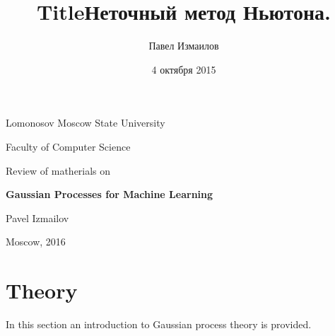 \documentclass[12pt]{article}
\title{Title}
\title{Неточный метод Ньютона.}
\date{4 октября 2015}
\author{Павел Измаилов}
\begin{document}
\renewcommand{\contentsname}{\centerline{\bf Contents}}
\renewcommand{\refname}{\centerline{\bf Literature}}

\newcommand{\GP}{\mathcal{GP}}
\newcommand{\E}{\mathbb{E}}
\newcommand{\R}{\mathbb{R}}
\newcommand{\N}{\mathcal{N}}
\newcommand{\cov}{\mbox{cov}}
\newcommand{\Nystrom}{Nystr\"{o}m }
\newcommand{\KL}[2]{\mbox{KL}\left(#1\mbox{ || }#2\right)}
\newcommand{\tr}{\mbox{tr}}
\newcommand{\derivative}[2]{\frac{\partial #1}{\partial #2}}

\newlength{\arrayrulewidthOriginal}
\newcommand{\Cline}[2]{%
  \noalign{\global\setlength{\arrayrulewidthOriginal}{\arrayrulewidth}}%
  \noalign{\global\setlength{\arrayrulewidth}{#1}}\cline{#2}%
  \noalign{\global\setlength{\arrayrulewidth}{\arrayrulewidthOriginal}}}

\newtheorem{definition}{Definition}
\newtheorem{theorem}{Theorem}


\def\vec#1{\mathchoice{\mbox{\boldmath$\displaystyle#1$}}
{\mbox{\boldmath$\textstyle#1$}} {\mbox{\boldmath$\scriptstyle#1$}} {\mbox{\boldmath$\scriptscriptstyle#1$}}}

\centerline{Lomonosov Moscow State University}

\centerline{Faculty of Computer Science}

\vspace{5 cm}

\centerline{\Large Review of matherials on}

\vspace{1 cm}

\centerline{\Large \bf Gaussian Processes for Machine Learning}

\vspace{6 cm}

\begin{flushright}

Pavel Izmailov
\end{flushright}

\vfill 

\centerline{Moscow,  2016}
\thispagestyle{empty} 
\pagebreak

\section{Theory}

\hspace{0.6cm}In this section an introduction to Gaussian process theory is provided.
\end{document}
